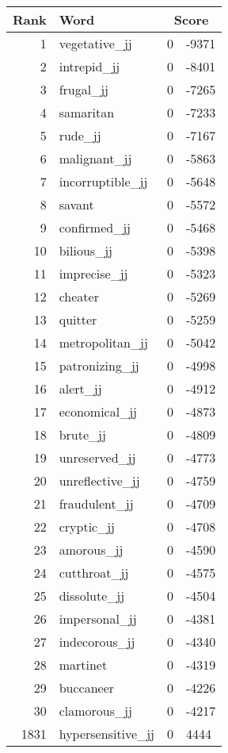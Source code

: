 \begin{longtable}[!htbp]{| rlr@{.}l |}
    \hline
    \textbf{Rank} & \textbf{Word} & \multicolumn{2}{c|}{\textbf{Score}} \\
    \hline
    \endhead
    1 & vegetative\_jj & 0 & -9371 \\
    2 & intrepid\_jj & 0 & -8401 \\
    3 & frugal\_jj & 0 & -7265 \\
    4 & samaritan & 0 & -7233 \\
    5 & rude\_jj & 0 & -7167 \\
    6 & malignant\_jj & 0 & -5863 \\
    7 & incorruptible\_jj & 0 & -5648 \\
    8 & savant & 0 & -5572 \\
    9 & confirmed\_jj & 0 & -5468 \\
    10 & bilious\_jj & 0 & -5398 \\
    11 & imprecise\_jj & 0 & -5323 \\
    12 & cheater & 0 & -5269 \\
    13 & quitter & 0 & -5259 \\
    14 & metropolitan\_jj & 0 & -5042 \\
    15 & patronizing\_jj & 0 & -4998 \\
    16 & alert\_jj & 0 & -4912 \\
    17 & economical\_jj & 0 & -4873 \\
    18 & brute\_jj & 0 & -4809 \\
    19 & unreserved\_jj & 0 & -4773 \\
    20 & unreflective\_jj & 0 & -4759 \\
    21 & fraudulent\_jj & 0 & -4709 \\
    22 & cryptic\_jj & 0 & -4708 \\
    23 & amorous\_jj & 0 & -4590 \\
    24 & cutthroat\_jj & 0 & -4575 \\
    25 & dissolute\_jj & 0 & -4504 \\
    26 & impersonal\_jj & 0 & -4381 \\
    27 & indecorous\_jj & 0 & -4340 \\
    28 & martinet & 0 & -4319 \\
    29 & buccaneer & 0 & -4226 \\
    30 & clamorous\_jj & 0 & -4217 \\
    1831 & hypersensitive\_jj & 0 & 4444 \\

\end{longtable}
